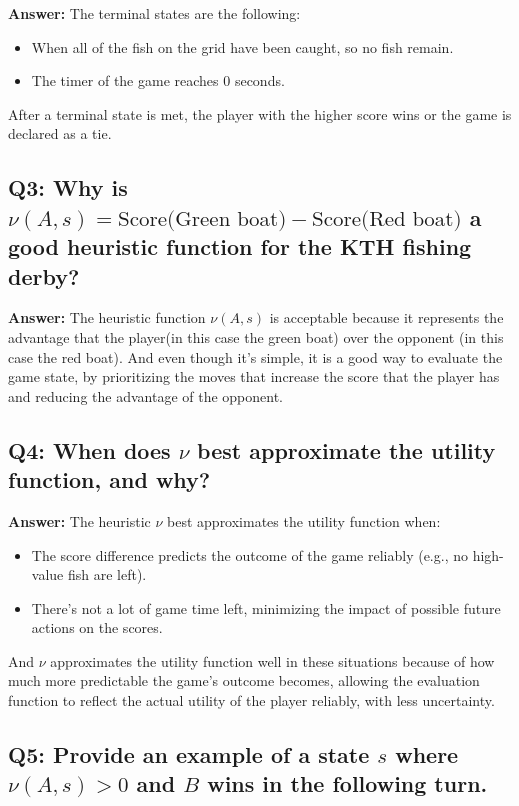 \documentclass[12pt]{article}
\begin{document}
\textbf{Answer:}  
The terminal states are the following:
\begin{itemize}
    \item When all of the fish on the grid have been caught, so no fish remain.
    \item The timer of the game reaches 0 seconds.
\end{itemize}
After a terminal state is met, the player with the higher score wins or the game is declared as a tie.

\subsection*{Q3: Why is \( \nu(A, s) = \text{Score(Green boat)} - \text{Score(Red boat)} \) a good heuristic function for the KTH fishing derby?}

\textbf{Answer:}  
The heuristic function \( \nu(A, s) \) is acceptable because it represents the advantage that the player(in this case the green boat) over the opponent  (in this case the red boat). And even though it's simple, it is a good way to evaluate the game state, by prioritizing the moves that increase the score that the player has and reducing the advantage of the opponent.

\subsection*{Q4: When does \( \nu \) best approximate the utility function, and why?}

\textbf{Answer:}  
The heuristic \( \nu \) best approximates the utility function when:
\begin{itemize}
    \item The score difference predicts the outcome of the game reliably (e.g., no high-value fish are left).
    \item There's not a lot of game time left, minimizing the impact of possible future actions on the scores.
\end{itemize}
And \( \nu \) approximates the utility function well in these situations because of how much more predictable the game's outcome becomes, allowing the evaluation function to reflect the actual utility of the player reliably, with less uncertainty.

\subsection*{Q5: Provide an example of a state \( s \) where \( \nu(A, s) > 0 \) and \( B \) wins in the following turn.}
\end{document}
